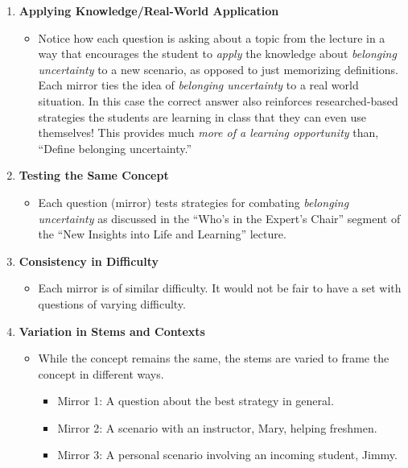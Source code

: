 \documentclass[
]{article}
\providecommand{\tightlist}{%
  \setlength{\itemsep}{0pt}\setlength{\parskip}{0pt}}
\begin{document}
\begin{enumerate}
\def\labelenumi{\arabic{enumi}.}
\tightlist
\item
  \textbf{Applying Knowledge/Real-World Application}

  \begin{itemize}
  \tightlist
  \item
    Notice how each question is asking about a topic from the lecture in a way that encourages the student to \emph{apply} the knowledge about \emph{belonging uncertainty} to a new scenario, as opposed to just memorizing definitions. Each mirror ties the idea of \emph{belonging uncertainty} to a real world situation. In this case the correct answer also reinforces researched-based strategies the students are learning in class that they can even use themselves! This provides much \emph{more of a learning opportunity} than, ``Define belonging uncertainty.''
  \end{itemize}
\item
  \textbf{Testing the Same Concept}

  \begin{itemize}
  \tightlist
  \item
    Each question (mirror) tests strategies for combating \emph{belonging uncertainty} as discussed in the ``Who's in the Expert's Chair'' segment of the ``New Insights into Life and Learning'' lecture.
  \end{itemize}
\item
  \textbf{Consistency in Difficulty}

  \begin{itemize}
  \tightlist
  \item
    Each mirror is of similar difficulty. It would not be fair to have a set with questions of varying difficulty.
  \end{itemize}
\item
  \textbf{Variation in Stems and Contexts}

  \begin{itemize}
  \tightlist
  \item
    While the concept remains the same, the stems are varied to frame the concept in different ways.

    \begin{itemize}
    \tightlist
    \item
      Mirror 1: A question about the best strategy in general.
    \item
      Mirror 2: A scenario with an instructor, Mary, helping freshmen.
    \item
      Mirror 3: A personal scenario involving an incoming student, Jimmy.
    \end{itemize}
  \end{itemize}
\end{enumerate}
\end{document}

